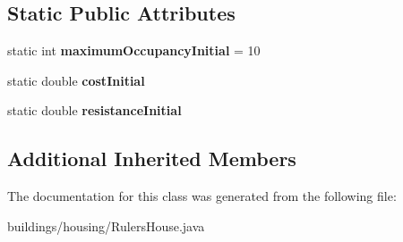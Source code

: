 \subsection*{Static Public Attributes}
\begin{DoxyCompactItemize}
\item 
static int {\bfseries maximum\+Occupancy\+Initial} = 10\hypertarget{classbuildings_1_1housing_1_1_rulers_house_ab2724f033a215f5f81516e569d39a0d8}{}\label{classbuildings_1_1housing_1_1_rulers_house_ab2724f033a215f5f81516e569d39a0d8}

\item 
static double {\bfseries cost\+Initial}\hypertarget{classbuildings_1_1housing_1_1_rulers_house_a4e46d10b64b57349d587770b16510769}{}\label{classbuildings_1_1housing_1_1_rulers_house_a4e46d10b64b57349d587770b16510769}

\item 
static double {\bfseries resistance\+Initial}\hypertarget{classbuildings_1_1housing_1_1_rulers_house_a6dda038886f921b03e4f6962cf23096b}{}\label{classbuildings_1_1housing_1_1_rulers_house_a6dda038886f921b03e4f6962cf23096b}

\end{DoxyCompactItemize}
\subsection*{Additional Inherited Members}


The documentation for this class was generated from the following file\+:\begin{DoxyCompactItemize}
\item 
buildings/housing/Rulers\+House.\+java\end{DoxyCompactItemize}

